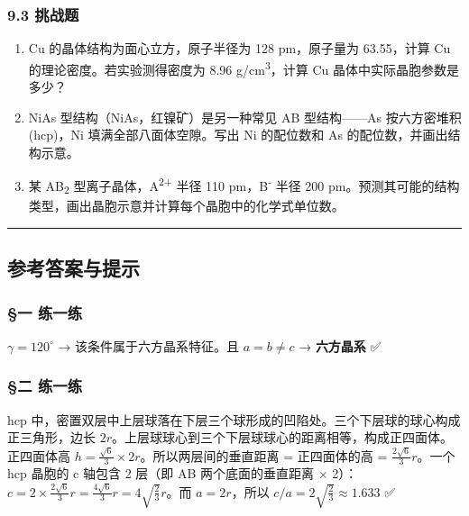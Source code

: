 \subsubsection{9.3 挑战题}\label{ux6311ux6218ux9898}

\begin{enumerate}
\def\labelenumi{\arabic{enumi}.}
\setcounter{enumi}{12}
\tightlist
\item
  Cu 的晶体结构为面心立方，原子半径为 128 pm，原子量为 63.55，计算 Cu 的理论密度。若实验测得密度为 8.96 g/cm\textsuperscript{3}，计算 Cu 晶体中实际晶胞参数是多少？
\item
  NiAs 型结构（NiAs，红镍矿）是另一种常见 AB 型结构------As 按六方密堆积(hcp)，Ni 填满全部八面体空隙。写出 Ni 的配位数和 As 的配位数，并画出结构示意。
\item
  某 AB\textsubscript{2} 型离子晶体，A\textsuperscript{2+} 半径 110 pm，B\textsuperscript{-} 半径 200 pm。预测其可能的结构类型，画出晶胞示意并计算每个晶胞中的化学式单位数。
\end{enumerate}

\begin{center}\rule{0.5\linewidth}{0.5pt}\end{center}

\subsection{参考答案与提示}\label{ux53c2ux8003ux7b54ux6848ux4e0eux63d0ux793a}

\subsubsection{§一 练一练}\label{ux4e00-ux7ec3ux4e00ux7ec3}

\(\gamma = 120^\circ\) → 该条件属于六方晶系特征。且 \(a = b \neq c\) → \textbf{六方晶系} ✅

\subsubsection{§二 练一练}\label{ux4e8c-ux7ec3ux4e00ux7ec3}

hcp 中，密置双层中上层球落在下层三个球形成的凹陷处。三个下层球的球心构成正三角形，边长 \(2r\)。上层球球心到三个下层球球心的距离相等，构成正四面体。正四面体高 \(h = \frac{\sqrt{6}}{3} \times 2r\)。所以两层间的垂直距离 = 正四面体的高 = \(\frac{2\sqrt{6}}{3}r\)。一个 hcp 晶胞的 c 轴包含 2 层（即 AB 两个底面的垂直距离 × 2）：\(c = 2 \times \frac{2\sqrt{6}}{3}r = \frac{4\sqrt{6}}{3}r = 4\sqrt{\frac{2}{3}}r\)。而 \(a = 2r\)，所以 \(c/a = 2\sqrt{\frac{2}{3}} \approx 1.633\) ✅

